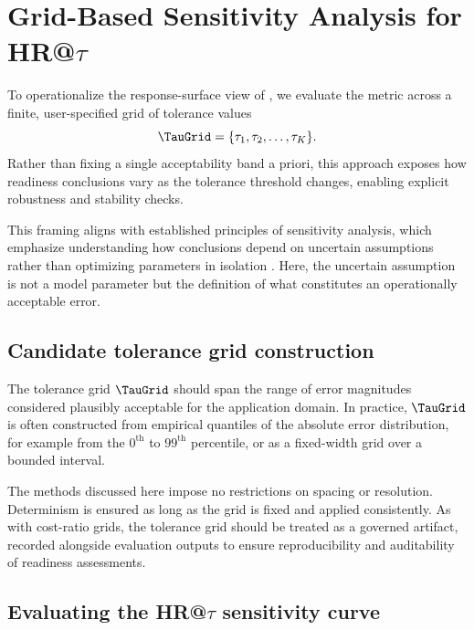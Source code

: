 \section{Grid-Based Sensitivity Analysis for HR@\(\tau\)}
\label{sec:sensitivity_analysis}

To operationalize the response-surface view of \HRtau{}, we evaluate the metric
across a finite, user-specified grid of tolerance values
\[
    \TauGrid = \{\tau_1, \tau_2, \ldots, \tau_K\}.
\]
Rather than fixing a single acceptability band a priori, this approach exposes
how readiness conclusions vary as the tolerance threshold changes, enabling
explicit robustness and stability checks.

This framing aligns with established principles of sensitivity analysis, which
emphasize understanding how conclusions depend on uncertain assumptions rather
than optimizing parameters in isolation \citep{saltelli2008}.
Here, the uncertain assumption is not a model parameter but the definition of
what constitutes an operationally acceptable error.

\subsection{Candidate tolerance grid construction}
\label{subsec:tau_grid_construction}

The tolerance grid $\TauGrid$ should span the range of error magnitudes considered
plausibly acceptable for the application domain.
In practice, $\TauGrid$ is often constructed from empirical quantiles of the
absolute error distribution, for example from the $0^{\text{th}}$ to
$99^{\text{th}}$ percentile, or as a fixed-width grid over a bounded interval.

The methods discussed here impose no restrictions on spacing or resolution.
Determinism is ensured as long as the grid is fixed and applied consistently.
As with cost-ratio grids, the tolerance grid should be treated as a governed
artifact, recorded alongside evaluation outputs to ensure reproducibility and
auditability of readiness assessments.

\subsection{Evaluating the HR@\(\tau\) sensitivity curve}
\label{subsec:hrtau_sensitivity_curve}

